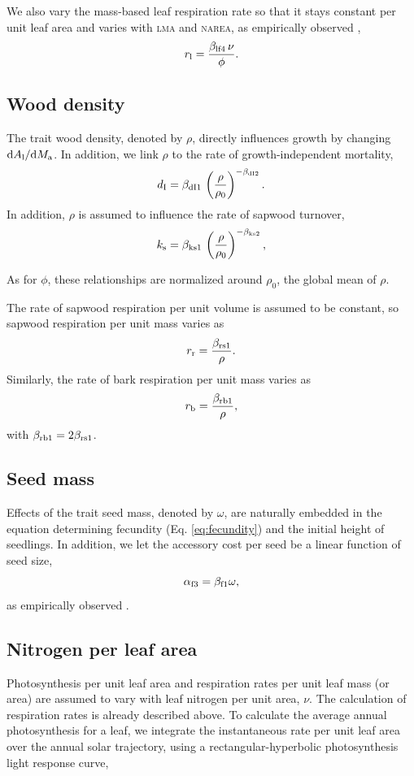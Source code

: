 \documentclass[10pt,twoside]{article}
\begin{document}
We also vary the mass-based leaf respiration rate so that it stays constant per unit leaf area and
varies with \textsc{lma} and \textsc{narea}, as empirically observed \cite{Wright-2004},
$$r_{\rm l} = \frac{\beta_{{\rm lf4}}\, \nu}{\phi}.$$

\subsection{Wood density}

The trait wood density, denoted by $\rho$, directly influences growth by changing
${\rm d}A_{\rm l} / {\rm d}M_{\rm a}$. In addition, we
link $\rho$ to the rate of growth-independent mortality,
$$d_{\rm I} = \beta_{{\rm dI1}} \, \left(\frac{\rho}{\rho_0}\right) ^ {-\beta_{{\rm dI2}}}.$$
In addition, $\rho$ is assumed to influence the rate of sapwood turnover,
$$k_{\rm s} = \beta_{{\rm ks1}} \, \left(\frac{\rho}{\rho_0}\right)^ {-\beta_{{\rm ks2}}},$$

As for $\phi$, these
relationships are normalized around $\rho_0$, the global mean of $\rho$.

The rate of sapwood respiration per unit volume is assumed to be constant, so
sapwood respiration per unit mass varies as
$$r_{\rm r}  = \frac{\beta_{{\rm rs1}}}{\rho}.$$
Similarly, the rate of bark respiration per unit mass varies as
$$r_{\rm b} = \frac{\beta_{{\rm rb1}}}{\rho},$$
with $\beta_{{\rm rb1}} = 2 \beta_{{\rm rs1}}$.

\subsection{Seed mass}

Effects of the trait seed mass, denoted by $\omega$, are naturally embedded in the equation determining
fecundity (Eq. \ref{eq:fecundity}) and the initial height of seedlings. In addition,
we let the accessory cost per seed be a linear function of seed size,
$$\alpha_{{\rm f3}} = \beta_{{\rm f1}} \omega,$$
as empirically observed \citep{Henery-2001}.

\subsection{Nitrogen per leaf area}

Photosynthesis per unit leaf area and respiration rates per unit leaf mass (or area)
are assumed to vary with leaf nitrogen per unit area, $\nu$. The calculation of respiration rates is already described above. To calculate the average annual photosynthesis for a leaf,
we integrate the instantaneous rate per unit leaf area over the annual solar trajectory,
using a rectangular-hyperbolic photosynthesis light response curve,
\end{document}
